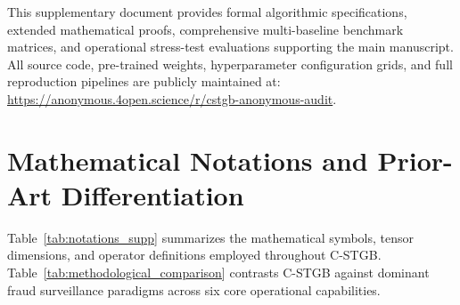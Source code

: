 \documentclass[a4paper,fleqn,twocolumn]{article}
\begin{document}
\pagestyle{myheadings}


\noindent This supplementary document provides formal algorithmic specifications, extended mathematical proofs, comprehensive multi-baseline benchmark matrices, and operational stress-test evaluations supporting the main manuscript. All source code, pre-trained weights, hyperparameter configuration grids, and full reproduction pipelines are publicly maintained at: \url{https://anonymous.4open.science/r/cstgb-anonymous-audit}.

\section{Mathematical Notations and Prior-Art Differentiation}
\label{sec:notations_supp}

Table~\ref{tab:notations_supp} summarizes the mathematical symbols, tensor dimensions, and operator definitions employed throughout C-STGB. Table~\ref{tab:methodological_comparison} contrasts C-STGB against dominant fraud surveillance paradigms across six core operational capabilities.
\end{document}
